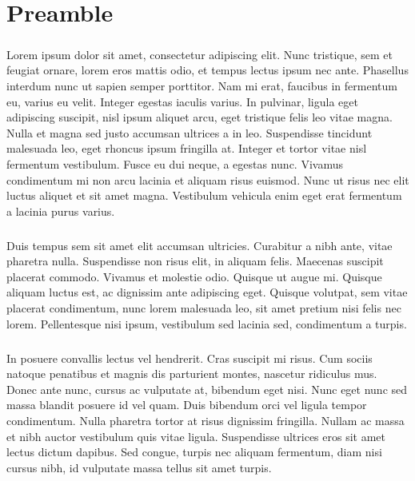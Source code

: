 \chapter{Preamble}
\paragraph{}
Lorem ipsum dolor sit amet, consectetur adipiscing elit. Nunc tristique, sem et feugiat ornare, lorem eros mattis odio, et tempus lectus ipsum nec ante. Phasellus interdum nunc ut sapien semper porttitor. Nam mi erat, faucibus in fermentum eu, varius eu velit. Integer egestas iaculis varius. In pulvinar, ligula eget adipiscing suscipit, nisl ipsum aliquet arcu, eget tristique felis leo vitae magna. Nulla et magna sed justo accumsan ultrices a in leo. Suspendisse tincidunt malesuada leo, eget rhoncus ipsum fringilla at. Integer et tortor vitae nisl fermentum vestibulum. Fusce eu dui neque, a egestas nunc. Vivamus condimentum mi non arcu lacinia et aliquam risus euismod. Nunc ut risus nec elit luctus aliquet et sit amet magna. Vestibulum vehicula enim eget erat fermentum a lacinia purus varius.

\paragraph{}
Duis tempus sem sit amet elit accumsan ultricies. Curabitur a nibh ante, vitae pharetra nulla. Suspendisse non risus elit, in aliquam felis. Maecenas suscipit placerat commodo. Vivamus et molestie odio. Quisque ut augue mi. Quisque aliquam luctus est, ac dignissim ante adipiscing eget. Quisque volutpat, sem vitae placerat condimentum, nunc lorem malesuada leo, sit amet pretium nisi felis nec lorem. Pellentesque nisi ipsum, vestibulum sed lacinia sed, condimentum a turpis.

\paragraph{}
In posuere convallis lectus vel hendrerit. Cras suscipit mi risus. Cum sociis natoque penatibus et magnis dis parturient montes, nascetur ridiculus mus. Donec ante nunc, cursus ac vulputate at, bibendum eget nisi. Nunc eget nunc sed massa blandit posuere id vel quam. Duis bibendum orci vel ligula tempor condimentum. Nulla pharetra tortor at risus dignissim fringilla. Nullam ac massa et nibh auctor vestibulum quis vitae ligula. Suspendisse ultrices eros sit amet lectus dictum dapibus. Sed congue, turpis nec aliquam fermentum, diam nisi cursus nibh, id vulputate massa tellus sit amet turpis.
